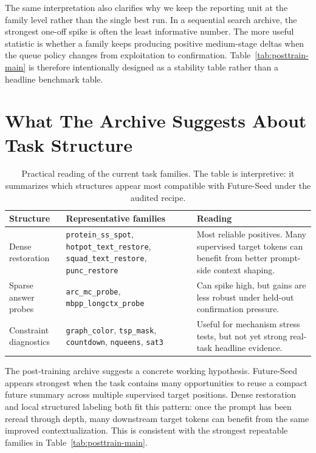 \documentclass{article}
\begin{document}
The same interpretation also clarifies why we keep the reporting unit at the family level rather than the single best run. In a sequential search archive, the strongest one-off spike is often the least informative number. The more useful statistic is whether a family keeps producing positive medium-stage deltas when the queue policy changes from exploitation to confirmation. Table~\ref{tab:posttrain-main} is therefore intentionally designed as a stability table rather than a headline benchmark table.


\section{What The Archive Suggests About Task Structure}
\begin{table}[t]
\centering
\small
\caption{Practical reading of the current task families. The table is interpretive: it summarizes which structures appear most compatible with Future-Seed under the audited recipe.}
\label{tab:task-structure}
\begin{tabular}{p{}p{}p{}}
\toprule
Structure & Representative families & Reading \\
\midrule
Dense restoration & \texttt{protein\_ss\_spot}, \texttt{hotpot\_text\_restore}, \texttt{squad\_text\_restore}, \texttt{punc\_restore} & Most reliable positives. Many supervised target tokens can benefit from better prompt-side context shaping. \\
Sparse answer probes & \texttt{arc\_mc\_probe}, \texttt{mbpp\_longctx\_probe} & Can spike high, but gains are less robust under held-out confirmation pressure. \\
Constraint diagnostics & \texttt{graph\_color}, \texttt{tsp\_mask}, \texttt{countdown}, \texttt{nqueens}, \texttt{sat3} & Useful for mechanism stress tests, but not yet strong real-task headline evidence. \\
\bottomrule
\end{tabular}
\end{table}

The post-training archive suggests a concrete working hypothesis. Future-Seed appears strongest when the task contains many opportunities to reuse a compact future summary across multiple supervised target positions. Dense restoration and local structured labeling both fit this pattern: once the prompt has been reread through depth, many downstream target tokens can benefit from the same improved contextualization. This is consistent with the strongest repeatable families in Table~\ref{tab:posttrain-main}.
\end{document}
